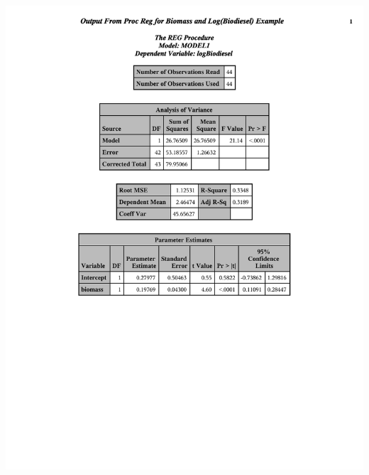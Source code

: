 \begin{center}
\includegraphics[scale=0.4,page=3,trim= 10mm 100mm 10mm 10mm]{slrbiodiesel}\\
\end{center}

\newpage

